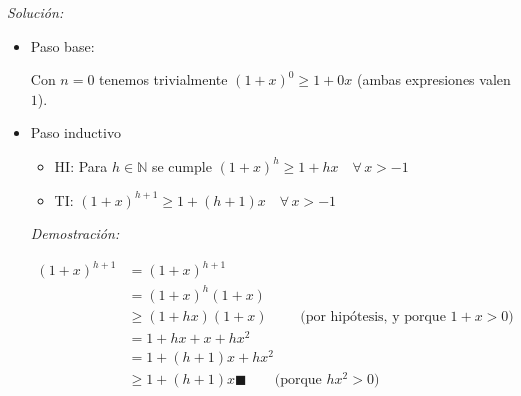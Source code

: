 \documentclass[10pt,a4paper]{article}
\newcommand{\qed}{\blacksquare}
\begin{document}
\noindent
\emph{Solución:}

\begin{itemize}
\item Paso base:
  
  Con $n=0$ tenemos trivialmente $(1+x)^0 \geq 1+0x$
  (ambas expresiones valen $1$).
  
\item Paso inductivo

  \begin{itemize}
  \item HI: Para $h \in \mathbb{N}$ se cumple
    $(1+x)^h \geq 1+hx \quad \forall \, x>-1$
  \item TI: $(1+x)^{h+1} \geq 1+(h+1)x \quad \forall \, x>-1$
  \end{itemize}
\emph{Demostración:}

\begin{align*}
  (1+x)^{h+1} &= (1+x)^{h+1} &\\
  &=    (1+x)^{h}(1+x) &\\
  &\geq (1+hx)(1+x) \qquad \text{ (por hipótesis, y porque $1+x>0$)}&\\
  &=    1+hx+x+hx^2 &\\
  &=    1+(h+1)x+hx^2 &\\
  &\geq 1+(h+1)x \qed \qquad \text{(porque $hx^2>0$)} &\\
\end{align*}
  
\end{itemize}
\end{document}

